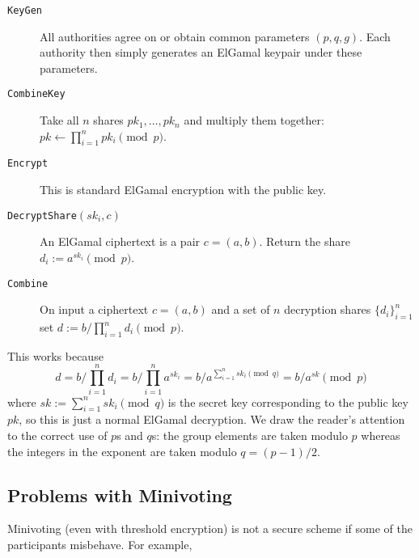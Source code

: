 \documentclass[envcountsame]{llncs}
\newcommand{\alg}[1]{\textup{\texttt{#1}}}
\begin{document}
\begin{description}
\item[\alg{KeyGen}]
All authorities agree on or obtain common parameters $(p, q, g)$. Each authority
then simply generates an ElGamal keypair under these parameters.

\item[\alg{CombineKey}]
Take all $n$ shares $pk_1, \ldots, pk_n$
and multiply them together:
$pk \gets \prod_{i=1}^n pk_i \pmod{p}$.

\item[\alg{Encrypt}] This is standard ElGamal encryption with the public key.

\item[\alg{DecryptShare}$(sk_i, c)$] An ElGamal ciphertext is a pair $c = (a, b)$. Return the share $d_i := a^{sk_i} \pmod{p}$.

\item[\alg{Combine}]
On input a ciphertext $c = (a, b)$ and a set of $n$ decryption shares
$\{d_i\}_{i=1}^n$
set $d := b / \prod_{i=1}^n d_i
\pmod{p}$.
\end{description}

This works because
\[
d = b / \prod_{i=1}^n d_i = b / \prod_{i=1}^n a^{sk_i} = b / a^{\sum_{i=1}^n sk_i \pmod{q}} = b / a^{sk} \pmod{p}
\]
where $sk := \sum_{i=1}^n sk_i \pmod{q}$ is the secret key corresponding to the
public key $pk$, so this is just a normal ElGamal decryption.
We draw the reader's attention to the correct use of $p$s and $q$s: the group
elements are taken modulo $p$ whereas the integers in the exponent are taken
modulo $q = (p-1)/2$.

\subsection{Problems with Minivoting}

Minivoting (even with threshold encryption) is not a secure scheme if some of
the participants misbehave. For example,
\end{document}
